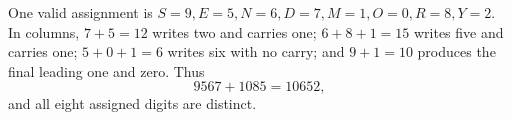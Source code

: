One valid assignment is $S=9,E=5,N=6,D=7,M=1,O=0,R=8,Y=2$. In columns, $7+5=12$ writes two and carries one; $6+8+1=15$ writes five and carries one; $5+0+1=6$ writes six with no carry; and $9+1=10$ produces the final leading one and zero. Thus
\[\boxed{9567+1085=10652},\]
and all eight assigned digits are distinct.
